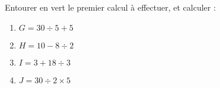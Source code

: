 
\begin{exercice}\label{exosmath-0729}

    Entourer en vert le premier calcul à effectuer, et calculer :
    \begin{multicols}{2}
        \begin{enumerate}
\item
$G = 30 \div 5 + 5$
\item
$H = 10 - 8 \div 2$
\item
$I = 3 + 18 \div 3$
\item
$J = 30 \div 2 \times 5$
        \end{enumerate}
    \end{multicols}

\end{exercice}

